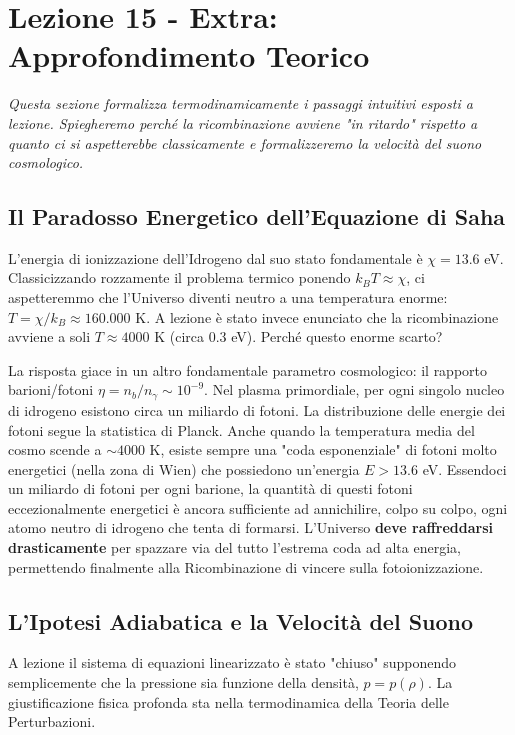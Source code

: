 \documentclass[11pt,a4paper]{report}
\begin{document}
\newpage
\section{Lezione 15 - Extra: Approfondimento Teorico}

\textit{Questa sezione formalizza termodinamicamente i passaggi intuitivi esposti a lezione. Spiegheremo perché la ricombinazione avviene "in ritardo" rispetto a quanto ci si aspetterebbe classicamente e formalizzeremo la velocità del suono cosmologico.}

\subsection{Il Paradosso Energetico dell'Equazione di Saha}
L'energia di ionizzazione dell'Idrogeno dal suo stato fondamentale è $\chi = 13.6$ eV. Classicizzando rozzamente il problema termico ponendo $k_B T \approx \chi$, ci aspetteremmo che l'Universo diventi neutro a una temperatura enorme: $T = \chi / k_B \approx 160.000$ K. A lezione è stato invece enunciato che la ricombinazione avviene a soli $T \approx 4000$ K (circa $0.3$ eV). Perché questo enorme scarto?

La risposta giace in un altro fondamentale parametro cosmologico: il rapporto barioni/fotoni $\eta = n_b / n_\gamma \sim 10^{-9}$. Nel plasma primordiale, per ogni singolo nucleo di idrogeno esistono circa un miliardo di fotoni. 
La distribuzione delle energie dei fotoni segue la statistica di Planck. Anche quando la temperatura media del cosmo scende a $\sim 4000$ K, esiste sempre una "coda esponenziale" di fotoni molto energetici (nella zona di Wien) che possiedono un'energia $E > 13.6$ eV. Essendoci un miliardo di fotoni per ogni barione, la quantità di questi fotoni eccezionalmente energetici è ancora sufficiente ad annichilire, colpo su colpo, ogni atomo neutro di idrogeno che tenta di formarsi. L'Universo \textbf{deve raffreddarsi drasticamente} per spazzare via del tutto l'estrema coda ad alta energia, permettendo finalmente alla Ricombinazione di vincere sulla fotoionizzazione.

\subsection{L'Ipotesi Adiabatica e la Velocità del Suono}
A lezione il sistema di equazioni linearizzato è stato "chiuso" supponendo semplicemente che la pressione sia funzione della densità, $p = p(\rho)$. La giustificazione fisica profonda sta nella termodinamica della Teoria delle Perturbazioni.
\end{document}
